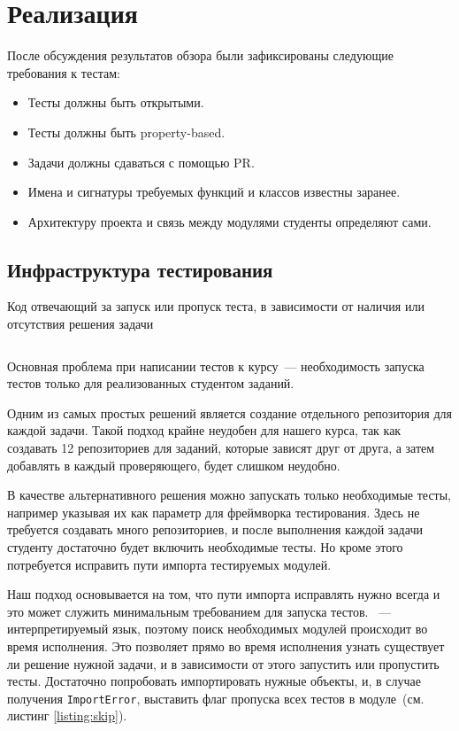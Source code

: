 
\section{Реализация}

После обсуждения результатов обзора были зафиксированы следующие требования к тестам:
\begin{itemize}
    \item Тесты должны быть открытыми.
    \item Тесты должны быть property-based.
    \item Задачи должны сдаваться с помощью PR.
    \item Имена и сигнатуры требуемых функций и классов известны заранее.
    \item Архитектуру проекта и связь между модулями студенты определяют сами.
\end{itemize}

\subsection{Инфраструктура тестирования}
\label{subsec:infra}

\begin{listing}[b]
    \caption{Код отвечающий за запуск или пропуск теста, в зависимости от наличия или отсутствия решения задачи}
    \inputminted[linenos, breaklines, frame=single, fontsize = \small]{python3}{figures/minimal_example.py}
    \label{listing:skip}
\end{listing}

Основная проблема при написании тестов к курсу~--- необходимость запуска тестов только для реализованных студентом заданий.

Одним из самых простых решений является создание отдельного репозитория для каждой задачи.
Такой подход крайне неудобен для нашего курса, так как создавать 12 репозиториев для заданий, которые зависят друг от друга, а затем добавлять в каждый проверяющего, будет слишком неудобно.

В качестве альтернативного решения можно запускать только необходимые тесты, например указывая их как параметр для фреймворка тестирования.
Здесь не требуется создавать много репозиториев, и после выполнения каждой задачи студенту достаточно будет включить необходимые тесты.
Но кроме этого потребуется исправить пути импорта тестируемых модулей.

Наш подход основывается на том, что пути импорта исправлять нужно всегда и это может служить минимальным требованием для запуска тестов.
\python{}~--- интерпретируемый язык, поэтому поиск необходимых модулей происходит во время исполнения.
Это позволяет прямо во время исполнения узнать существует ли решение нужной задачи, и в зависимости от этого запустить или пропустить тесты.
Достаточно попробовать импортировать нужные объекты, и, в случае получения \texttt{ImportError}, выставить флаг пропуска всех тестов в модуле~(см. листинг \ref{listing:skip}).

